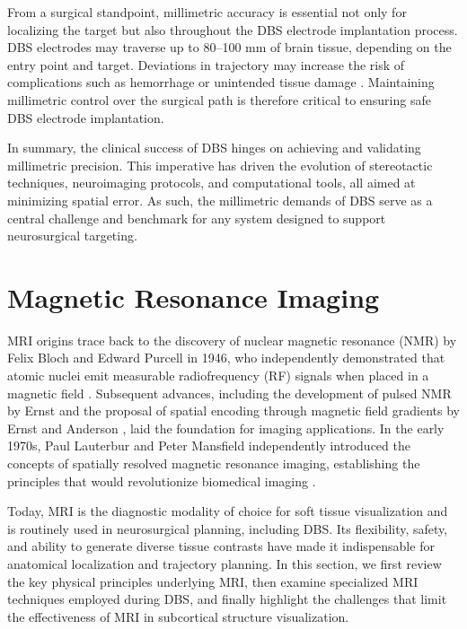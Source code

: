 From a surgical standpoint, millimetric accuracy is essential not only for localizing the target but also throughout the DBS electrode implantation process. DBS electrodes may traverse up to 80–100 mm of brain tissue, depending on the entry point and target. Deviations in trajectory may increase the risk of complications such as hemorrhage or unintended tissue damage \cite{Ben-Haim2009-os,Rajabian2023-st}. Maintaining millimetric control over the surgical path is therefore critical to ensuring safe DBS electrode implantation.
 
In summary, the clinical success of DBS hinges on achieving and validating millimetric precision. This imperative has driven the evolution of stereotactic techniques, neuroimaging protocols, and computational tools, all aimed at minimizing spatial error. As such, the millimetric demands of DBS serve as a central challenge and benchmark for any system designed to support neurosurgical targeting.

\section{Magnetic Resonance Imaging}
\label{sec:MRI}
MRI origins trace back to the discovery of nuclear magnetic resonance (NMR) by Felix Bloch and Edward Purcell in 1946, who independently demonstrated that atomic nuclei emit measurable radiofrequency (RF) signals when placed in a magnetic field \cite{Bloch1946-ob, Purcell1946-jd}. Subsequent advances, including the development of pulsed NMR by Ernst \cite{Ernst1990-we} and the proposal of spatial encoding through magnetic field gradients by Ernst and Anderson \cite{Ernst1966-yx}, laid the foundation for imaging applications. In the early 1970s, Paul Lauterbur and Peter Mansfield independently introduced the concepts of spatially resolved magnetic resonance imaging, establishing the principles that would revolutionize biomedical imaging \cite{Lauterbur1973-wf,Mansfield1977-ru}. 

Today, MRI is the diagnostic modality of choice for soft tissue visualization and is routinely used in neurosurgical planning, including DBS. Its flexibility, safety, and ability to generate diverse tissue contrasts have made it indispensable for anatomical localization and trajectory planning. In this section, we first review the key physical principles underlying MRI, then examine specialized MRI techniques employed during DBS, and finally highlight the challenges that limit the effectiveness of MRI in subcortical structure visualization.

